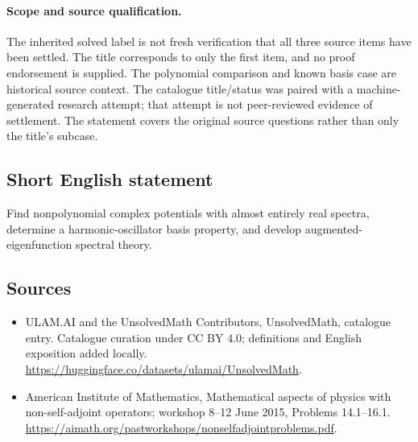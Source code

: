 \documentclass[11pt]{article}
\begin{document}
\paragraph{Scope and source qualification.}The inherited solved label is not fresh verification that all three source items have been settled. The title corresponds to only the first item, and no proof endorsement is supplied. The polynomial comparison and known basis case are historical source context. The catalogue title/status was paired with a machine-generated research attempt; that attempt is not peer-reviewed evidence of settlement. The statement covers the original source questions rather than only the title’s subcase.
\subsection{Short English statement}
Find nonpolynomial complex potentials with almost entirely real spectra, determine a harmonic-oscillator basis property, and develop augmented-eigenfunction spectral theory.
\subsection{Sources}
\begin{itemize}
\item[\hypertarget{source:statement:1}{S1}] ULAM.AI and the UnsolvedMath Contributors, UnsolvedMath, catalogue entry. Catalogue curation under CC BY 4.0; definitions and English exposition added locally.
\url{https://huggingface.co/datasets/ulamai/UnsolvedMath}.
\item[\hypertarget{source:statement:2}{S2}] American Institute of Mathematics, Mathematical aspects of physics with non-self-adjoint operators; workshop 8–12 June 2015, Problems 14.1–16.1.
\url{https://aimath.org/pastworkshops/nonselfadjointproblems.pdf}.
\end{itemize}
\label{end:statement}
\end{document}

